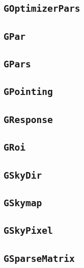 \documentclass{article}[12pt,a4]
\begin{document}
\subsection{{\tt GOptimizerPars}}

\subsection{{\tt GPar}}

\subsection{{\tt GPars}}

\subsection{{\tt GPointing}}

\subsection{{\tt GResponse}}

\subsection{{\tt GRoi}}

\subsection{{\tt GSkyDir}}

\subsection{{\tt GSkymap}}

\subsection{{\tt GSkyPixel}}

\subsection{{\tt GSparseMatrix}}
\end{document}
